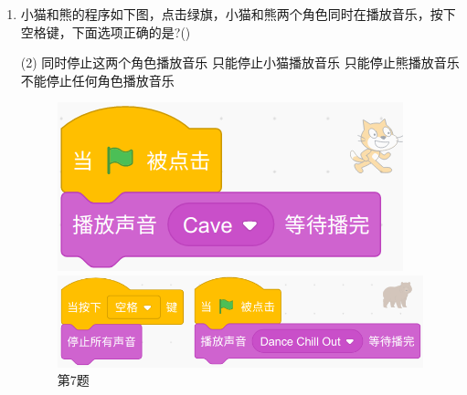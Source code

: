 \documentclass[10pt, a4paper]{article}
\begin{document}
\begin{enumerate}
        \newpage
        \item 小猫和熊的程序如下图，点击绿旗，小猫和熊两个角色同时在播放音乐，按下空格键，下面选项正确的是?(\qquad)
        \begin{tasks}(2)
            \task 同时停止这两个角色播放音乐
            \task 只能停止小猫播放音乐
            \task 只能停止熊播放音乐
            \task 不能停止任何角色播放音乐
        \end{tasks}

        \begin{figure}[htbp]
            \centering
            \begin{minipage}[t]{.5\textwidth}
                \begin{minipage}[t]{.4\textwidth}
                    \centering
                    \includegraphics[width=\textwidth]{7-1.png}
                \end{minipage}
                \begin{minipage}[t]{.58\textwidth}
                    \centering
                    \includegraphics[width=\textwidth]{7-2.png}
                \end{minipage}
                \caption*{第7题}
            \end{minipage}
            \begin{minipage}[t]{.16\textwidth}
                \centering

\end{minipage}
\end{figure}
\end{enumerate}
\end{document}

